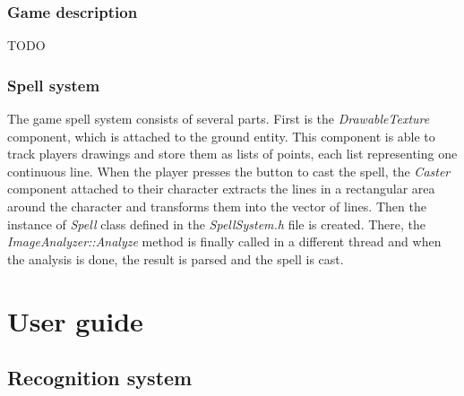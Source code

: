 \subsection{Game description}
TODO

\subsection{Spell system}
The game spell system consists of several parts. First is the \emph{DrawableTexture} component, which is attached to the ground entity. This component is able to track players drawings and store them as lists of points, each list representing one continuous line. When the player presses the button to cast the spell, the \emph{Caster} component attached to their character extracts the lines in a rectangular area around the character and transforms them into the vector of lines. Then the instance of \emph{Spell} class defined in the \emph{SpellSystem.h} file is created. There, the \emph{ImageAnalyzer::Analyze} method is finally called in a different thread and when the analysis is done, the result is parsed and the spell is cast.

\chapter{User guide}
\section{Recognition system}
